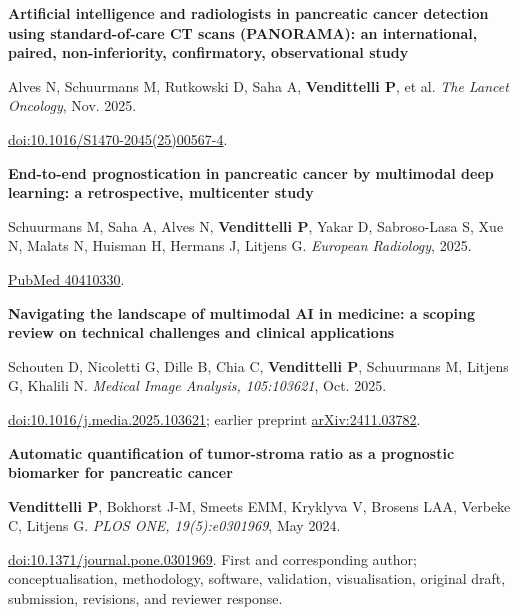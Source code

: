 \newcommand{\canonicalpublication}[5]{%
  \Needspace{5\baselineskip}%
  \begingroup\color{black}
  \begin{sloppypar}
  \noindent\textbf{#1}\par
  {\small #2. \emph{#3}, #4.\par}
  {\small #5\par}
  \end{sloppypar}
  \endgroup\vspace{1.5mm}
}


\canonicalpublication
  {Artificial intelligence and radiologists in pancreatic cancer detection using standard-of-care CT scans (PANORAMA): an international, paired, non-inferiority, confirmatory, observational study}
  {Alves N, Schuurmans M, Rutkowski D, Saha A, \textbf{Vendittelli P}, et al}
  {The Lancet Oncology}
  {Nov. 2025}
  {\href{https://doi.org/10.1016/S1470-2045(25)00567-4}{doi:10.1016/S1470-2045(25)00567-4}.}

\canonicalpublication
  {End-to-end prognostication in pancreatic cancer by multimodal deep learning: a retrospective, multicenter study}
  {Schuurmans M, Saha A, Alves N, \textbf{Vendittelli P}, Yakar D, Sabroso-Lasa S, Xue N, Malats N, Huisman H, Hermans J, Litjens G}
  {European Radiology}
  {2025}
  {\href{https://pubmed.ncbi.nlm.nih.gov/40410330/}{PubMed 40410330}.}

\canonicalpublication
  {Navigating the landscape of multimodal AI in medicine: a scoping review on technical challenges and clinical applications}
  {Schouten D, Nicoletti G, Dille B, Chia C, \textbf{Vendittelli P}, Schuurmans M, Litjens G, Khalili N}
  {Medical Image Analysis, 105:103621}
  {Oct. 2025}
  {\href{https://doi.org/10.1016/j.media.2025.103621}{doi:10.1016/j.media.2025.103621}; earlier preprint \href{https://arxiv.org/abs/2411.03782}{arXiv:2411.03782}.}

\canonicalpublication
  {Automatic quantification of tumor-stroma ratio as a prognostic biomarker for pancreatic cancer}
  {\textbf{Vendittelli P}, Bokhorst J-M, Smeets EMM, Kryklyva V, Brosens LAA, Verbeke C, Litjens G}
  {PLOS ONE, 19(5):e0301969}
  {May 2024}
  {\href{https://doi.org/10.1371/journal.pone.0301969}{doi:10.1371/journal.pone.0301969}. First and corresponding author; conceptualisation, methodology, software, validation, visualisation, original draft, submission, revisions, and reviewer response.}

